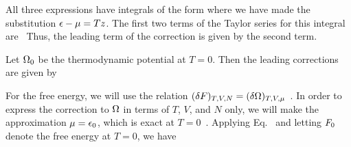 {	All three expressions have integrals of the form
	where we have made the substitution $\epsilon - \mu = T z$.  The first two terms of the Taylor series for this integral are~\cite[p.~155]{Landau}
	Thus, the leading term of the correction is given by the second term.
	
	Let $\Omega_0$ be the thermodynamic potential at $T = 0$.  Then the leading corrections are given by
	
	For the free energy, we will use the relation $(\delta F)_{T, V, N} = (\delta \Omega)_{T, V, \mu}$~\cite[pp.~69, 156]{Landau}.  In order to express the correction to $\Omega$ in terms of $T$, $V$, and $N$ only, we will make the approximation $\mu = \epsilon_0$, which is exact at $T = 0$~\cite[p.~153]{Landau}.  Applying Eq.~ and letting $F_0$ denote the free energy at $T = 0$, we have
	
}
